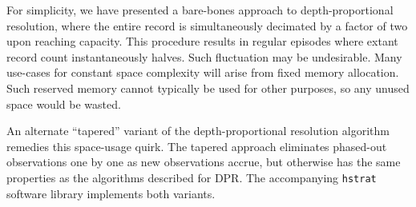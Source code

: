 For simplicity, we have presented a bare-bones approach to depth-proportional resolution, where the entire record is simultaneously decimated by a factor of two upon reaching capacity.
This procedure results in regular episodes where extant record count instantaneously halves.
Such fluctuation may be undesirable.
Many use-cases for constant space complexity will arise from fixed memory allocation.
Such reserved memory cannot typically be used for other purposes, so any unused space would be wasted.

An alternate ``tapered'' variant of the depth-proportional resolution algorithm remedies this space-usage quirk.
The tapered approach eliminates phased-out observations one by one as new observations accrue, but otherwise has the same properties as the algorithms described for DPR.
The accompanying \texttt{hstrat} software library implements both variants.



% 
% 
